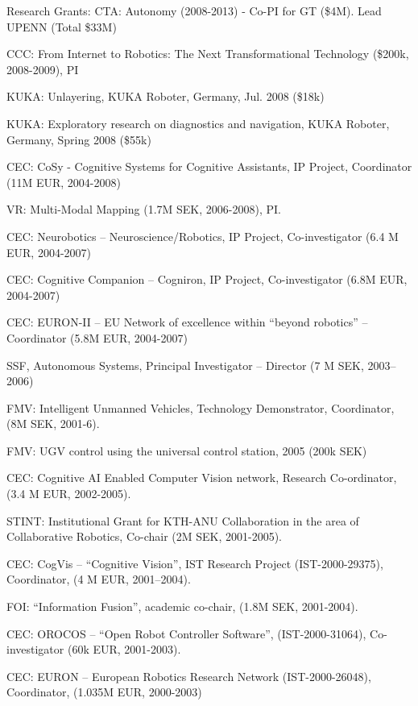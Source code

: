 \documentclass{article}
\begin{document}
\begin{cv}
\begin{cvlist}{Research Grants:}
  CTA: Autonomy (2008-2013) - Co-PI for GT (\$4M). Lead UPENN (Total \$33M) %
\item CCC: From Internet to Robotics: The Next Transformational
  Technology (\$200k, 2008-2009), PI %
\item KUKA: Unlayering, KUKA Roboter, Germany, Jul. 2008 (\$18k) %
\item KUKA: Exploratory research on diagnostics and navigation, KUKA
  Roboter, Germany, Spring 2008 (\$55k)%
\item CEC: CoSy - Cognitive Systems for Cognitive Assistants, IP
  Project, Coordinator (11M EUR, 2004-2008)
\item VR: Multi-Modal Mapping (1.7M SEK, 2006-2008), PI.%
\item CEC: Neurobotics -- Neuroscience/Robotics, IP Project,
  Co-investigator (6.4 M EUR, 2004-2007)%
\item CEC: Cognitive Companion -- Cogniron, IP Project,
  Co-investigator (6.8M EUR, 2004-2007) %
\item CEC: EURON-II -- EU Network of excellence within ``beyond
  robotics''  -- Coordinator (5.8M EUR, 2004-2007) %
\item SSF, Autonomous Systems, Principal Investigator -- Director  (7
  M SEK, 2003--2006) %
\item FMV: Intelligent Unmanned Vehicles, Technology Demonstrator,
  Coordinator, (8M SEK, 2001-6). %
\item FMV: UGV control using the universal control station, 2005 (200k
  SEK) %
\item CEC: Cognitive AI Enabled Computer Vision network, Research
  Co-ordinator, (3.4 M EUR, 2002-2005). %
\item STINT: Institutional Grant for KTH-ANU Collaboration in the area
  of Collaborative Robotics, Co-chair (2M SEK, 2001-2005).%
\item CEC: CogVis -- ``Cognitive Vision'', IST Research Project
  (IST-2000-29375), Coordinator, (4 M EUR, 2001--2004).%
\item FOI: ``Information Fusion'', academic co-chair,  (1.8M SEK, 2001-2004).%
\item CEC: OROCOS -- ``Open Robot Controller Software'',
  (IST-2000-31064), Co-investigator (60k EUR, 2001-2003).%
\item CEC: EURON -- European Robotics Research Network
  (IST-2000-26048), Coordinator, (1.035M EUR, 2000-2003)%

\end{cvlist}
\end{cv}
\end{document}
